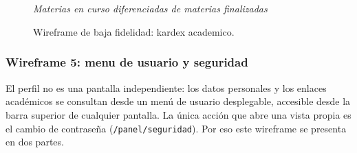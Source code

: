 \begin{figure}[H]
{{\\[5pt]
\\[5pt]
\\[5pt]
\\[14pt]
{\scriptsize\itshape\color{black!55} Materias en curso diferenciadas de materias finalizadas}%
}}
\caption{Wireframe de baja fidelidad: kardex academico.}
\label{fig:wf-kardex}
\end{figure}

\subsubsection*{Wireframe 5: menu de usuario y seguridad}

El perfil no es una pantalla independiente: los datos personales y los enlaces académicos se consultan desde un menú de usuario desplegable, accesible desde la barra superior de cualquier pantalla. La única acción que abre una vista propia es el cambio de contraseña (\texttt{/panel/seguridad}). Por eso este wireframe se presenta en dos partes.

